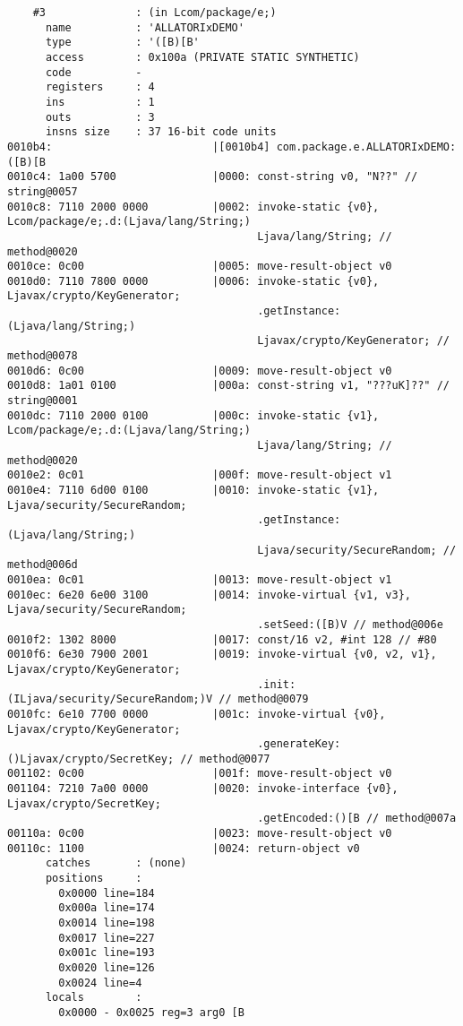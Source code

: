 \begin{lstlisting}
    #3              : (in Lcom/package/e;)
      name          : 'ALLATORIxDEMO'
      type          : '([B)[B'
      access        : 0x100a (PRIVATE STATIC SYNTHETIC)
      code          -
      registers     : 4
      ins           : 1
      outs          : 3
      insns size    : 37 16-bit code units
0010b4:                         |[0010b4] com.package.e.ALLATORIxDEMO:([B)[B
0010c4: 1a00 5700               |0000: const-string v0, "N??" // string@0057
0010c8: 7110 2000 0000          |0002: invoke-static {v0}, Lcom/package/e;.d:(Ljava/lang/String;)
                                       Ljava/lang/String; // method@0020
0010ce: 0c00                    |0005: move-result-object v0
0010d0: 7110 7800 0000          |0006: invoke-static {v0}, Ljavax/crypto/KeyGenerator;
                                       .getInstance:(Ljava/lang/String;)
                                       Ljavax/crypto/KeyGenerator; // method@0078
0010d6: 0c00                    |0009: move-result-object v0
0010d8: 1a01 0100               |000a: const-string v1, "???uK]??" // string@0001
0010dc: 7110 2000 0100          |000c: invoke-static {v1}, Lcom/package/e;.d:(Ljava/lang/String;)
                                       Ljava/lang/String; // method@0020
0010e2: 0c01                    |000f: move-result-object v1
0010e4: 7110 6d00 0100          |0010: invoke-static {v1}, Ljava/security/SecureRandom;
                                       .getInstance:(Ljava/lang/String;)
                                       Ljava/security/SecureRandom; // method@006d
0010ea: 0c01                    |0013: move-result-object v1
0010ec: 6e20 6e00 3100          |0014: invoke-virtual {v1, v3}, Ljava/security/SecureRandom;
                                       .setSeed:([B)V // method@006e
0010f2: 1302 8000               |0017: const/16 v2, #int 128 // #80
0010f6: 6e30 7900 2001          |0019: invoke-virtual {v0, v2, v1}, Ljavax/crypto/KeyGenerator;
                                       .init:(ILjava/security/SecureRandom;)V // method@0079
0010fc: 6e10 7700 0000          |001c: invoke-virtual {v0}, Ljavax/crypto/KeyGenerator;
                                       .generateKey:()Ljavax/crypto/SecretKey; // method@0077
001102: 0c00                    |001f: move-result-object v0
001104: 7210 7a00 0000          |0020: invoke-interface {v0}, Ljavax/crypto/SecretKey;
                                       .getEncoded:()[B // method@007a
00110a: 0c00                    |0023: move-result-object v0
00110c: 1100                    |0024: return-object v0
      catches       : (none)
      positions     :
        0x0000 line=184
        0x000a line=174
        0x0014 line=198
        0x0017 line=227
        0x001c line=193
        0x0020 line=126
        0x0024 line=4
      locals        :
        0x0000 - 0x0025 reg=3 arg0 [B


\end{lstlisting}
